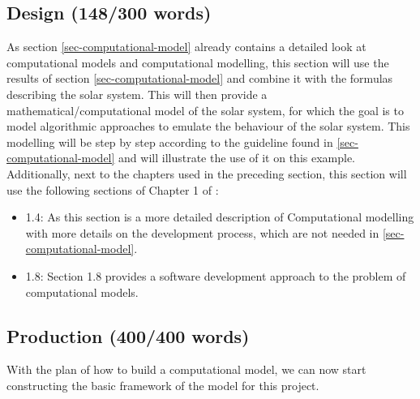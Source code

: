 \documentclass[conference,compsoc]{IEEEtran}
\begin{document}
\subsection{Design (148/300 words)}
As section \ref{sec-computational-model} already contains a detailed look at computational models and computational modelling, this section will use the results of section \ref{sec-computational-model} and combine it with the formulas describing the solar system. This will then provide a mathematical/computational model of the solar system, for which the goal is to model algorithmic approaches to emulate the behaviour of the solar system. This modelling will be step by step according to the guideline found in \ref{sec-computational-model} and will illustrate the use of it on this example. \\
Additionally, next to the chapters used in the preceding section, this section will use the following sections of Chapter 1 of \cite{ComputationalModelsIntroduction}:
\begin{itemize}
	\item 1.4: As this section is a more detailed description of Computational modelling with more details on the development process, which are not needed in \ref{sec-computational-model}.
	\item 1.8: Section 1.8 provides a software development approach to the problem of computational models.
\end{itemize} 

\subsection{Production (400/400 words)}
With the plan of how to build a computational model, we can now start constructing the basic framework of the model for this project.
\end{document}

